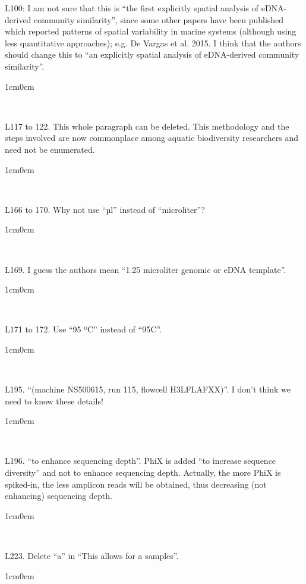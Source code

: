 \documentclass{article}
\newenvironment{response}
	{
	\begin{adjustwidth}{1cm}{0cm}
	\itshape %
	}
	{
	\end{adjustwidth}
	}
\begin{document}
L100: I am not sure that this is “the first explicitly spatial analysis of eDNA-derived community similarity”, since some other papers have been published which reported patterns of spatial variability in marine systems (although using less quantitative approaches); e.g. De Vargas et al. 2015. I think that the authors should change this to “an explicitly spatial analysis of eDNA-derived community similarity”.
\begin{response}
  \\
\end{response}

L117 to 122. This whole paragraph can be deleted. This methodology and the steps involved are now commonplace among aquatic biodiversity researchers and need not be enumerated.
\begin{response}
  \\
\end{response}

L166 to 170. Why not use “µl” instead of “microliter”?
\begin{response}
  \\
\end{response}

L169. I guess the authors mean “1.25 microliter genomic or eDNA template”.
\begin{response}
  \\
\end{response}

L171 to 172. Use “95 ºC” instead of “95C”.
\begin{response}
  \\
\end{response}

L195. “(machine NS500615, run 115, flowcell H3LFLAFXX)”. I don't think we need to know these details!
\begin{response}
  \\
\end{response}

L196. “to enhance sequencing depth”. PhiX is added “to increase sequence diversity” and not to enhance sequencing depth. Actually, the more PhiX is spiked-in, the less amplicon reads will be obtained, thus decreasing (not enhancing) sequencing depth.
\begin{response}
  \\
\end{response}

L223. Delete “a” in “This allows for a samples”.
\begin{response}
  \\
\end{response}
\end{document}

